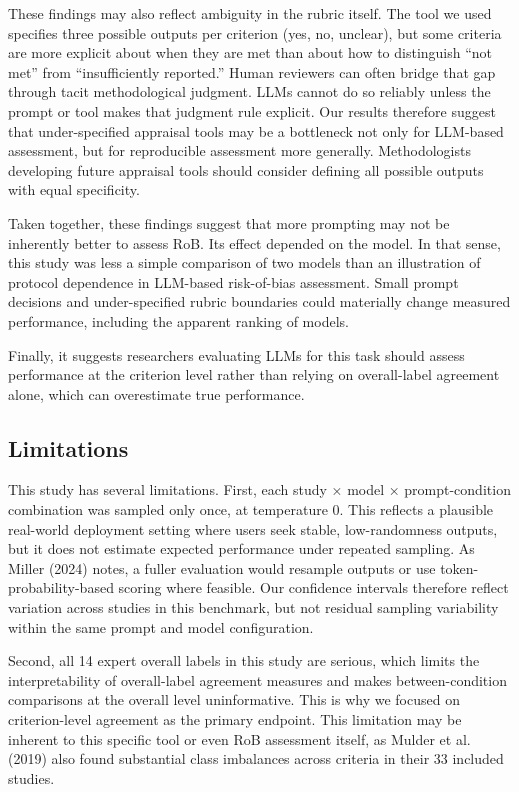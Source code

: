 \documentclass[11pt,a4paper]{article}
\begin{document}
These findings may also reflect ambiguity in the rubric itself. The tool we used specifies three possible outputs per criterion (yes, no, unclear), but some criteria are more explicit about when they are met than about how to distinguish “not met” from “insufficiently reported.” Human reviewers can often bridge that gap through tacit methodological judgment. LLMs cannot do so reliably unless the prompt or tool makes that judgment rule explicit. Our results therefore suggest that under-specified appraisal tools may be a bottleneck not only for LLM-based assessment, but for reproducible assessment more generally. Methodologists developing future appraisal tools should consider defining all possible outputs with equal specificity.

Taken together, these findings suggest that more prompting may not be inherently better to assess RoB. Its effect depended on the model. In that sense, this study was less a simple comparison of two models than an illustration of protocol dependence in LLM-based risk-of-bias assessment. Small prompt decisions and under-specified rubric boundaries could materially change measured performance, including the apparent ranking of models.

Finally, it suggests researchers evaluating LLMs for this task should assess performance at the criterion level rather than relying on overall-label agreement alone, which can overestimate true performance.

\subsection{Limitations}

This study has several limitations. First, each study × model × prompt-condition combination was sampled only once, at temperature 0. This reflects a plausible real-world deployment setting where users seek stable, low-randomness outputs, but it does not estimate expected performance under repeated sampling. As Miller (2024) notes, a fuller evaluation would resample outputs or use token-probability-based scoring where feasible. Our confidence intervals therefore reflect variation across studies in this benchmark, but not residual sampling variability within the same prompt and model configuration.

Second, all 14 expert overall labels in this study are serious, which limits the interpretability of overall-label agreement measures and makes between-condition comparisons at the overall level uninformative. This is why we focused on criterion-level agreement as the primary endpoint. This limitation may be inherent to this specific tool or even RoB assessment itself, as Mulder et al. (2019) also found substantial class imbalances across criteria in their 33 included studies.
\end{document}
